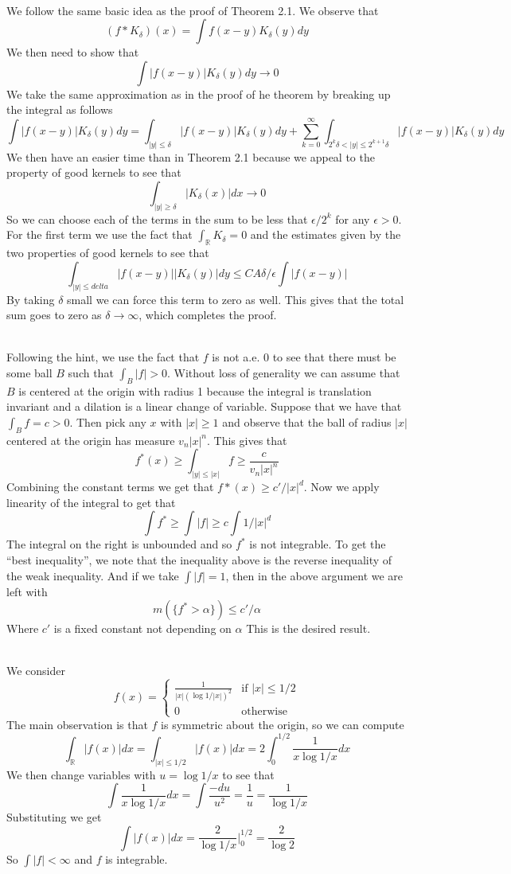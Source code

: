 \documentclass{article}
\DeclareMathOperator{\R}{\mathbb{R}}
\newcommand{\problem}[1]{\noindent{\textbf{Problem #1}}\\}
\newcommand{\problempart}[1]{\noindent{\textbf{(#1)}}}
\begin{document}
\problem{3.5.2} We follow the same basic idea as the proof of Theorem 2.1. We observe that
\[
(f * K_\delta)(x) = \int f(x-y)K_\delta(y)dy
\]
We then need to show that
\[
\int |f(x-y)|K_\delta(y)dy \to 0
\]
We take the same approximation as in the proof of he theorem by breaking up the integral as follows
\[
\int |f(x-y)|K_\delta(y)dy = \int_{|y| \leq \delta} |f(x-y)|K_\delta(y)dy + \sum_{k=0}^\infty \int_{2^k\delta < |y| \leq 2^{k+1}\delta}|f(x-y)|K_\delta(y)dy
\]
We then have an easier time than in Theorem 2.1 because we appeal to the property of good kernels to see that
\[
\int_{|y| \geq \delta} |K_\delta(x)|dx \to 0
\]
So we can choose each of the terms in the sum to be less that $\epsilon/2^k$ for any $\epsilon > 0$. For the first term we use the fact that $\int_{\R} K_\delta = 0$ and the estimates given by the two properties of good kernels to see that 
\[
\int_{|y| \leq delta } |f(x-y)||K_\delta(y)|dy \leq CA\delta/\epsilon\int |f(x-y)|
\]
By taking $\delta$ small we can force this term to zero as well. This gives that the total sum goes to zero as $\delta \to \infty$, which completes the proof. 

\problem{3.5.4} Following the hint, we use the fact that $f$ is not a.e. 0 to see that there must be some ball $B$ such that $\int_B |f| > 0$. Without loss of generality we can assume that $B$ is centered at the origin with radius 1 because the integral is translation invariant and a dilation is a linear change of variable. Suppose that we have that $\int_B f = c > 0$. Then pick any $x$ with $|x| \geq 1$ and observe that the ball of radius $|x|$ centered at the origin has measure $v_n|x|^n$. This gives that
\[
f^*(x) \geq \int_{|y| \leq |x|} f \geq \frac{c}{v_n|x|^n}
\] 
Combining the constant terms we get that $f*(x) \geq c'/|x|^d$. Now we apply linearity of the integral to get that
\[
\int f^* \geq \int |f| \geq c\int 1/|x|^d
\]
The integral on the right is unbounded and so $f^*$ is not integrable. To get the ``best inequality'', we note that the inequality above is the reverse inequality of the weak inequality. And if we take $\int|f| = 1$, then in the above argument we are left with 
\[
m(\{f^* > \alpha\}) \leq c'/\alpha
\]
Where $c'$ is a fixed constant not depending on $\alpha$ This is the desired result. 

\problem{3.5.5}
\problempart{a} We consider 
\[
f(x) = \begin{cases}
\frac{1}{|x|(\log 1/|x|)^2} & \text{if } |x| \leq 1/2 \\
0                                      & \text{otherwise}
\end{cases}
\]
The main observation is that $f$ is symmetric about the origin, so we can compute
\[
\int_{\R} |f(x)|dx = \int_{|x| \leq 1/2} |f(x)|dx = 2\int_{0}^{1/2} \frac{1}{x\log 1/x}dx
\]
We then change variables with $u = \log 1/x$ to see that 
\[
\int \frac{1}{x\log 1/x}dx = \int \frac{-du}{u^2} = \frac{1}{u} = \frac{1}{\log 1/x} 
\]
Substituting we get
\[
\int |f(x)|dx = \frac{2}{\log 1/x}\Big |_0^{1/2} = \frac{2}{\log 2}
\]
So $\int |f| < \infty$ and $f$ is integrable. 
\end{document}
